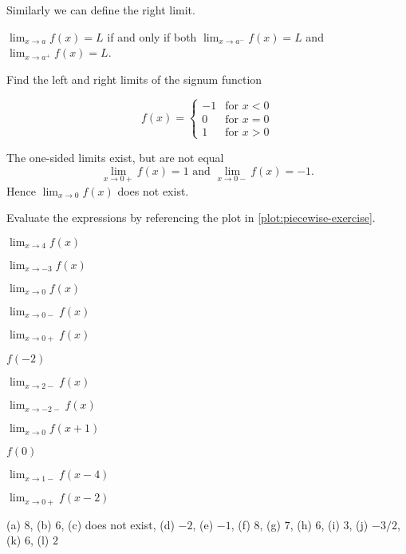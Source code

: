 \documentclass[calc1-main.tex]{subfiles}
\begin{document}
  Similarly we can define the right limit.

  \begin{theorem}
    $\lim_{x \to a} f(x) = L$ if and only if both $\lim_{x \to a^{-}} f(x) =L$ and $\lim_{x \to a^{+}} f(x) = L$.
  \end{theorem}

  \begin{example}
    Find the left and right limits of the signum function

    \begin{minipage}[c]{0.5\textwidth}
      \[
        f(x) =
        \begin{cases}
          -1 & \text{for $x<0$}\\ 0 & \text{for $x=0$}\\ 1 & \text{for $x>0$}
        \end{cases}
      \]
    \end{minipage}
    \begin{minipage}[c]{0.2\textwidth}
      \begin{figure}[H]
        \centering
        
      \end{figure}
    \end{minipage}
  \end{example}
  \begin{solution}
    The one-sided limits exist, but are not equal
    \[
      \lim_{x\to0+}f(x) = 1 \text{ and } \lim_{x\to0-}f(x) = -1.
    \]
    Hence $\lim_{x\to 0} f(x)$ does not exist.
  \end{solution}


\begin{example} Evaluate the expressions by referencing the plot in \autoref{plot:piecewise-exercise}.
\begin{figure}[H]
  \centering
  
  \caption{\label{plot:piecewise-exercise}}
\end{figure}

\begin{enumerate}[a)]
\begin{multicols}{3}
\item $\lim_{x\to 4} f(x)$
\item $\lim_{x\to -3} f(x)$
\item $\lim_{x\to 0} f(x)$
\item $\lim_{x\to 0-} f(x)$
\item $\lim_{x\to 0+} f(x)$
\item $f(-2)$
\item $\lim_{x\to 2-} f(x)$
\item $\lim_{x\to -2-} f(x)$
\item $\lim_{x\to 0} f(x+1)$
\item $f(0)$
\item $\lim_{x\to 1-} f(x-4)$
\item $\lim_{x\to 0+} f(x-2)$
\end{multicols}
\end{enumerate}

(a) $8$, (b) $6$, (c) does not exist,
(d) $-2$, (e) $-1$, (f) $8$,
(g) $7$, (h) $6$, (i) $3$,
(j) $-3/2$, (k) $6$, (l) $2$
\end{example}
\end{document}
